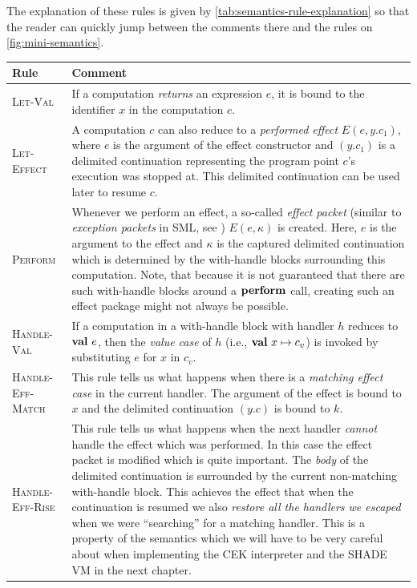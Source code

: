 \documentclass[class=article, crop=false]{standalone}
\begin{document}
The explanation of these rules is given by \autoref{tab:semantics-rule-explanation}
so that the reader can quickly jump between the comments there and the rules on
\autoref{fig:mini-semantics}.

\begin{table}
  \small
  \centering
  {\renewcommand{\arraystretch}{1.3}
  \begin{tabularx}{\textwidth}{lX}
  \toprule
  Rule & Comment \\
  \midrule
  \textsc{Let-Val} & 
    If a computation \emph{returns} an expression $e$, it is bound to the
    identifier $x$ in the computation $c$. \\

  \textsc{Let-Effect} & 
    A computation $c$ can also reduce to a \emph{performed effect} $E(e, y.c_1)$,
    where $e$ is the argument of the effect constructor and $(y.c_1)$ is a
    delimited continuation representing the program point $c$'s execution was
    stopped at. This delimited continuation can be used later to resume $c$. \\

  \textsc{Perform} &
    Whenever we perform an effect, a so-called \emph{effect packet} (similar to
    \emph{exception packets} in SML, see \cite{paulson1996ml}) $E(e, \kappa)$
    is created. Here, $e$ is the argument to the effect and $\kappa$ is the
    captured delimited continuation which is determined by the with-handle
    blocks surrounding this computation. Note, that because it is not guaranteed
    that there are such with-handle blocks around a $\mathbf{perform}\ $call, creating
    such an effect package might not always be possible. \\

  \textsc{Handle-Val} & 
    If a computation in a with-handle block with handler $h$ reduces to
    $\mathbf{val}\  e$, then the \emph{value case} of $h$ (i.e., $\mathbf{val}\  x \mapsto c_v$)
    is invoked by substituting $e$ for $x$ in $c_v$. \\

  \textsc{Handle-Eff-Match} &
    This rule tells us what happens when there is a \emph{matching effect case}
    in the current handler. The argument of the effect is bound to $x$ and the
    delimited continuation $(y.c)$ is bound to $k$. \\

  \textsc{Handle-Eff-Rise} &
    This rule tells us what happens when the next handler \emph{cannot} handle
    the effect which was performed. In this case the effect packet is modified
    which is quite important. The \emph{body} of the delimited continuation is
    surrounded by the current non-matching with-handle block. This achieves the
    effect that when the continuation is resumed we also \emph{restore all the
    handlers we escaped} when we were ``searching'' for a matching handler.
    This is a property of the semantics which we will have to be very careful
    about when implementing the CEK interpreter and the SHADE VM in the next
    chapter.\\


\end{tabularx}}
\end{table}
\end{document}
